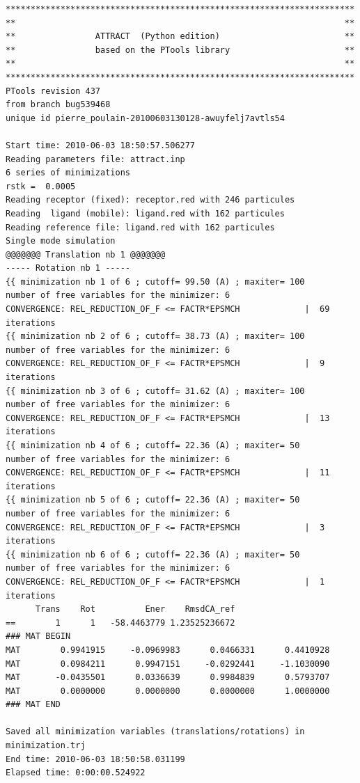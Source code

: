 \documentclass[12pt,a4paper]{article}
\begin{document}
\linenumbers*
\begin{verbatim}
**********************************************************************
**                                                                  **
**                ATTRACT  (Python edition)                         **
**                based on the PTools library                       **
**                                                                  **
**********************************************************************
PTools revision 437
from branch bug539468
unique id pierre_poulain-20100603130128-awuyfelj7avtls54

Start time: 2010-06-03 18:50:57.506277
Reading parameters file: attract.inp
6 series of minimizations
rstk =  0.0005
Reading receptor (fixed): receptor.red with 246 particules
Reading  ligand (mobile): ligand.red with 162 particules
Reading reference file: ligand.red with 162 particules
Single mode simulation
@@@@@@@ Translation nb 1 @@@@@@@
----- Rotation nb 1 -----
{{ minimization nb 1 of 6 ; cutoff= 99.50 (A) ; maxiter= 100
number of free variables for the minimizer: 6
CONVERGENCE: REL_REDUCTION_OF_F <= FACTR*EPSMCH             |  69 iterations
{{ minimization nb 2 of 6 ; cutoff= 38.73 (A) ; maxiter= 100
number of free variables for the minimizer: 6
CONVERGENCE: REL_REDUCTION_OF_F <= FACTR*EPSMCH             |  9 iterations
{{ minimization nb 3 of 6 ; cutoff= 31.62 (A) ; maxiter= 100
number of free variables for the minimizer: 6
CONVERGENCE: REL_REDUCTION_OF_F <= FACTR*EPSMCH             |  13 iterations
{{ minimization nb 4 of 6 ; cutoff= 22.36 (A) ; maxiter= 50
number of free variables for the minimizer: 6
CONVERGENCE: REL_REDUCTION_OF_F <= FACTR*EPSMCH             |  11 iterations
{{ minimization nb 5 of 6 ; cutoff= 22.36 (A) ; maxiter= 50
number of free variables for the minimizer: 6
CONVERGENCE: REL_REDUCTION_OF_F <= FACTR*EPSMCH             |  3 iterations
{{ minimization nb 6 of 6 ; cutoff= 22.36 (A) ; maxiter= 50
number of free variables for the minimizer: 6
CONVERGENCE: REL_REDUCTION_OF_F <= FACTR*EPSMCH             |  1 iterations
      Trans    Rot          Ener    RmsdCA_ref
==        1      1   -58.4463779 1.23525236672
### MAT BEGIN
MAT        0.9941915     -0.0969983      0.0466331      0.4410928 
MAT        0.0984211      0.9947151     -0.0292441     -1.1030090 
MAT       -0.0435501      0.0336639      0.9984839      0.5793707 
MAT        0.0000000      0.0000000      0.0000000      1.0000000 
### MAT END

Saved all minimization variables (translations/rotations) in minimization.trj
End time: 2010-06-03 18:50:58.031199
Elapsed time: 0:00:00.524922
\end{verbatim}
\nolinenumbers
\end{document}
